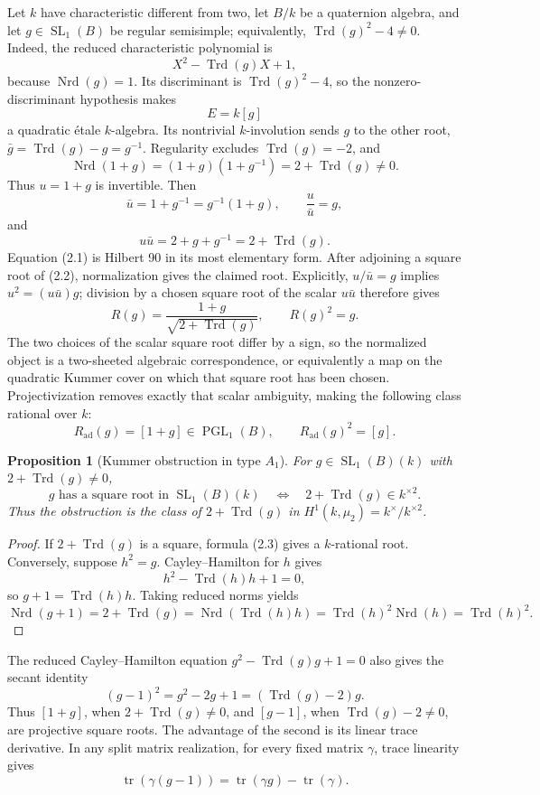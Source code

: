 \documentclass[11pt,reqno]{amsart}
\newtheorem{proposition}[theorem]{Proposition}
\theoremstyle{definition}
\theoremstyle{remark}
\newcommand{\Tr}{\operatorname{tr}}
\newcommand{\Trd}{\operatorname{Trd}}
\newcommand{\Nrd}{\operatorname{Nrd}}
\newcommand{\SL}{\operatorname{SL}}
\newcommand{\PGL}{\operatorname{PGL}}
\newcommand{\aad}{\mathrm{ad}}
\begin{document}
Let \(k\) have characteristic different from two, let \(B/k\) be a quaternion
algebra, and let \(g\in\SL_1(B)\) be regular semisimple; equivalently,
\(\Trd(g)^2-4\ne0\).  Indeed, the reduced characteristic polynomial is
\[
 X^2-\Trd(g)X+1,
\]
because \(\Nrd(g)=1\).  Its discriminant is
\(\Trd(g)^2-4\), so the nonzero-discriminant hypothesis makes
\[
 E=k[g]
\]
a quadratic \'etale \(k\)-algebra.  Its nontrivial \(k\)-involution sends
\(g\) to the other root,
\(\bar g=\Trd(g)-g=g^{-1}\).  Regularity excludes
\(\Trd(g)=-2\), and
\[
 \Nrd(1+g)=(1+g)(1+g^{-1})=2+\Trd(g)\ne0.
\]
Thus \(u=1+g\) is invertible.  Then
\[
 \bar u=1+g^{-1}=g^{-1}(1+g),
 \qquad
 \frac{u}{\bar u}=g,
\tag{2.1}
\]
and
\[
 u\bar u=2+g+g^{-1}=2+\Trd(g).
\tag{2.2}
\]
Equation (2.1) is Hilbert 90 in its most elementary form.  After adjoining a
square root of (2.2), normalization gives the claimed root.  Explicitly,
\(u/\bar u=g\) implies \(u^2=(u\bar u)g\); division by a chosen square root
of the scalar \(u\bar u\) therefore gives
\[
 R(g)=\frac{1+g}{\sqrt{2+\Trd(g)}},
 \qquad R(g)^2=g.
\tag{2.3}
\]
The two choices of the scalar square root differ by a sign, so the normalized
object is a two-sheeted algebraic correspondence, or equivalently a map on
the quadratic Kummer cover on which that square root has been chosen.
Projectivization removes exactly that scalar ambiguity, making the following
class rational over \(k\):
\[
 R_{\aad}(g)=[1+g]\in\PGL_1(B),
 \qquad R_{\aad}(g)^2=[g].
\tag{2.4}
\]

\begin{proposition}[Kummer obstruction in type \(A_1\)]
For \(g\in\SL_1(B)(k)\) with \(2+\Trd(g)\ne0\),
\[
 g\text{ has a square root in }\SL_1(B)(k)
 \quad\Longleftrightarrow\quad
 2+\Trd(g)\in k^{\times2}.
\]
Thus the obstruction is the class of \(2+\Trd(g)\) in
\(H^1(k,\mu_2)=k^\times/k^{\times2}\).
\end{proposition}

\begin{proof}
If \(2+\Trd(g)\) is a square, formula (2.3) gives a \(k\)-rational
root.  Conversely, suppose \(h^2=g\).
Cayley--Hamilton for \(h\) gives
\[
 h^2-\Trd(h)h+1=0,
\]
so \(g+1=\Trd(h)h\).  Taking reduced norms yields
\[
 \Nrd(g+1)=2+\Trd(g)
 =\Nrd(\Trd(h)h)=\Trd(h)^2\Nrd(h)=\Trd(h)^2.
\]
\end{proof}

The reduced Cayley--Hamilton equation
\(g^2-\Trd(g)g+1=0\) also gives the secant identity
\[
 (g-1)^2=g^2-2g+1=(\Trd(g)-2)g.
\tag{2.5}
\]
Thus \([1+g]\), when \(2+\Trd(g)\ne0\), and \([g-1]\), when
\(\Trd(g)-2\ne0\), are projective square roots.  The
advantage of the second is its linear trace derivative.  In any split matrix
realization, for every fixed matrix \(\gamma\), trace linearity gives
\[
 \Tr(\gamma(g-1))=\Tr(\gamma g)-\Tr(\gamma).
\tag{2.6}
\]
\end{document}
